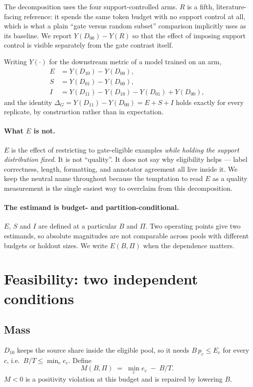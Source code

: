 \documentclass[10pt,twocolumn]{article}
\begin{document}
The decomposition uses the four support-controlled arms. $R$ is a fifth, literature-facing
reference: it spends the same token budget with no support control at all, which is what a
plain ``gate versus random subset'' comparison implicitly uses as its baseline. We report
$Y(D_{00})-Y(R)$ so that the effect of imposing support control is visible separately from the
gate contrast itself.

Writing $Y(\cdot)$ for the downstream metric of a model trained on an arm,
\begin{align}
E &= Y(D_{10}) - Y(D_{00}), \label{eq:E}\\
S &= Y(D_{01}) - Y(D_{00}), \label{eq:S}\\
I &= Y(D_{11}) - Y(D_{10}) - Y(D_{01}) + Y(D_{00}), \label{eq:I}
\end{align}
and the identity $\Delta_G = Y(D_{11})-Y(D_{00}) = E+S+I$ holds exactly for every replicate,
by construction rather than in expectation.

\paragraph{What $E$ is not.}
$E$ is the effect of restricting to gate-eligible examples \emph{while holding the support
distribution fixed}. It is not ``quality''. It does not say why eligibility helps --- label
correctness, length, formatting, and annotator agreement all live inside it. We keep the
neutral name throughout because the temptation to read $E$ as a quality measurement is the
single easiest way to overclaim from this decomposition.

\paragraph{The estimand is budget- and partition-conditional.}
$E$, $S$ and $I$ are defined at a particular $B$ and $\Pi$. Two operating points give two
estimands, so absolute magnitudes are not comparable across pools with different budgets or
holdout sizes. We write $E(B,\Pi)$ when the dependence matters.

\section{Feasibility: two independent conditions}

\subsection{Mass}
$D_{10}$ keeps the source share inside the eligible pool, so it needs
$B\,p_c \le E_c$ for every $c$, i.e.\ $B/T \le \min_c e_c$. Define
\begin{equation}
M(B,\Pi) \;=\; \min_c e_c \;-\; B/T .
\label{eq:M}
\end{equation}
$M<0$ is a positivity violation at this budget and is repaired by lowering $B$.
\end{document}
